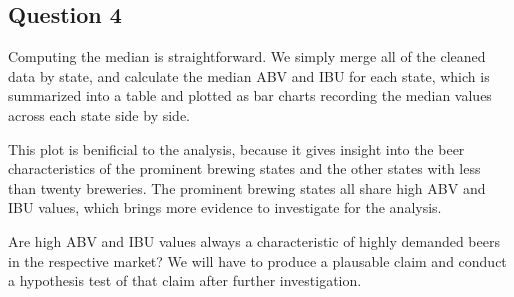 \documentclass[]{article}
\newenvironment{Shaded}{\begin{snugshade}}{\end{snugshade}}
\newcommand{\KeywordTok}[1]{\textcolor[rgb]{0.13,0.29,0.53}{\textbf{#1}}}
\newcommand{\DataTypeTok}[1]{\textcolor[rgb]{0.13,0.29,0.53}{#1}}
\newcommand{\DecValTok}[1]{\textcolor[rgb]{0.00,0.00,0.81}{#1}}
\newcommand{\StringTok}[1]{\textcolor[rgb]{0.31,0.60,0.02}{#1}}
\newcommand{\CommentTok}[1]{\textcolor[rgb]{0.56,0.35,0.01}{\textit{#1}}}
\newcommand{\OtherTok}[1]{\textcolor[rgb]{0.56,0.35,0.01}{#1}}
\newcommand{\OperatorTok}[1]{\textcolor[rgb]{0.81,0.36,0.00}{\textbf{#1}}}
\newcommand{\NormalTok}[1]{#1}
\begin{document}
\subsection{Question 4}\label{question-4}

Computing the median is straightforward. We simply merge all of the
cleaned data by state, and calculate the median ABV and IBU for each
state, which is summarized into a table and plotted as bar charts
recording the median values across each state side by side.

This plot is benificial to the analysis, because it gives insight into
the beer characteristics of the prominent brewing states and the other
states with less than twenty breweries. The prominent brewing states all
share high ABV and IBU values, which brings more evidence to investigate
for the analysis.

Are high ABV and IBU values always a characteristic of highly demanded
beers in the respective market? We will have to produce a plausable
claim and conduct a hypothesis test of that claim after further
investigation.

\begin{Shaded}
\end{Shaded}
\end{document}
